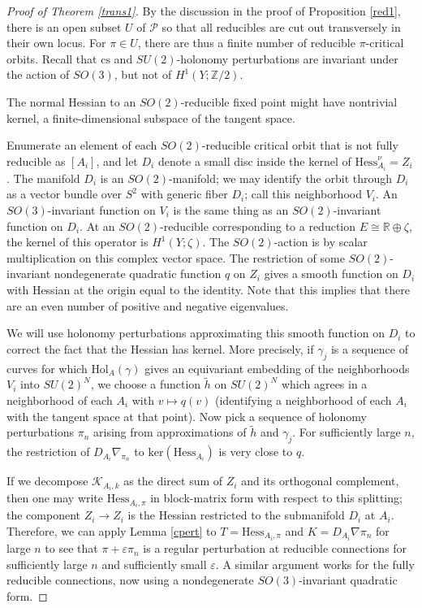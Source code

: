 \documentclass[10pt,a4paper]{amsart}
\theoremstyle{definition}
\theoremstyle{remark}
\numberwithin{figure}{qchap}
\begin{document}
\begin{proof}[Proof of Theorem \ref{trans1}]By the discussion in the proof of Proposition \ref{red1}, there is an open subset $U$ of $\mathcal P$ so that all reducibles are cut out transversely in their own locus. For $\pi \in U$, there are thus a finite number of reducible $\pi$-critical orbits. Recall that $\text{cs}$ and $SU(2)$-holonomy perturbations are invariant under the action of $SO(3)$, but not of $H^1(Y;\mathbb Z/2)$. 

The normal Hessian to an $SO(2)$-reducible fixed point might have nontrivial kernel, a finite-dimensional subspace of the tangent space. 

Enumerate an element of each $SO(2)$-reducible critical orbit that is not fully reducible as $[A_i]$, and let $D_i$ denote a small disc inside the kernel of $\text{Hess}^\nu_{A_i} = Z_i$. The manifold $D_i$ is an $SO(2)$-manifold; we may identify the orbit through $D_i$ as a vector bundle over $S^2$ with generic fiber $D_i$; call this neighborhood $V_i$. An $SO(3)$-invariant function on $V_i$ is the same thing as an $SO(2)$-invariant function on $D_i$. At an $SO(2)$-reducible corresponding to a reduction $E \cong \mathbb R \oplus \zeta$, the kernel of this operator is $H^1(Y;\zeta)$. The $SO(2)$-action is by scalar multiplication on this complex vector space. The restriction of some $SO(2)$-invariant nondegenerate quadratic function $q$ on $Z_i$ gives a smooth function on $D_i$ with Hessian at the origin equal to the identity. Note that this implies that there are an even number of positive and negative eigenvalues. 

We will use holonomy perturbations approximating this smooth function on $D_i$ to correct the fact that the Hessian has kernel. More precisely, if $\gamma_j$ is a sequence of curves for which $\text{Hol}_A(\gamma)$ gives an equivariant embedding of the neighborhoods $V_i$ into $SU(2)^N$, we choose a function $\tilde h$ on $SU(2)^N$ which agrees in a neighborhood of each $A_i$ with $v \mapsto q(v)$ (identifying a neighborhood of each $A_i$ with the tangent space at that point). Now pick a sequence of holonomy perturbations $\pi_n$ arising from approximations of $\tilde h$ and $\gamma_j$. For sufficiently large $n$, the restriction of $D_{A_i}\nabla_{\pi_n}$ to $\text{ker}(\text{Hess}_{A_i})$ is very close to $q$.

If we decompose $\mathcal K_{A_i,k}$ as the direct sum of $Z_i$ and its orthogonal complement, then one may write $\text{Hess}_{A_i, \pi}$ in block-matrix form with respect to this splitting; the component $Z_i \to Z_i$ is the Hessian restricted to the submanifold $D_i$ at $A_i$. Therefore, we can apply Lemma \ref{cpert} to $T = \text{Hess}_{A_i,\pi}$ and $K = D_{A_i}\nabla \pi_n$ for large $n$ to see that $\pi+\varepsilon \pi_n$ is a regular perturbation at reducible connections for sufficiently large $n$ and sufficiently small $\varepsilon$. A similar argument works for the fully reducible connections, now using a nondegenerate $SO(3)$-invariant quadratic form.


\end{proof}
\end{document}
